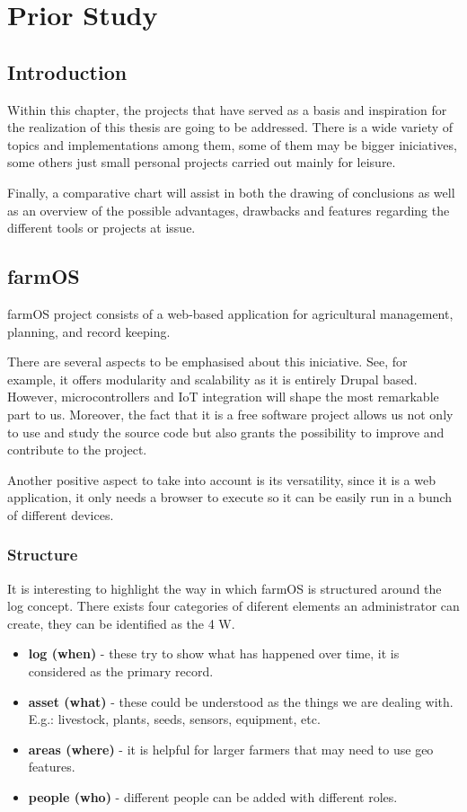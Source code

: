 \chapter{Prior Study}\label{cap:planificación}

\section{Introduction}
Within this chapter, the projects that have served as a basis and inspiration for the realization of this thesis are going to be addressed. There is a wide variety of topics and implementations among them, some of them may be bigger iniciatives, some others just small personal projects carried out mainly for leisure.

Finally, a comparative chart will assist in both the drawing of conclusions as well as an overview of the possible advantages, drawbacks and features regarding the different tools or projects at issue.

\section{farmOS}
farmOS project consists of a web-based application for agricultural management, planning, and record keeping.

There are several aspects to be emphasised about this iniciative. See, for example, it offers modularity and scalability as it is entirely Drupal based. However, microcontrollers and IoT integration will shape the most remarkable part to us. Moreover, the fact that it is a free software project allows us not only to use and study the source code but also grants the possibility to improve and contribute to the project.

Another positive aspect to take into account is its versatility, since it is a web application, it only needs a browser to execute so it can be easily run in a bunch of different devices.

\subsection{Structure}
It is interesting to highlight the way in which farmOS is structured around the log concept. There exists four categories of diferent elements an administrator can create, they can be identified as the 4 W.
\begin{itemize}
	\item \textbf{log (when)} - these try to show what has happened over time, it is considered as the primary record.
	\item \textbf{asset (what)} - these could be understood as the things we are dealing with. E.g.: livestock, plants, seeds, sensors, equipment, etc.
	\item \textbf{areas (where)} - it is helpful for larger farmers that may need to use geo features.
	\item \textbf{people (who)} - different people can be added with different roles.
\end{itemize}


